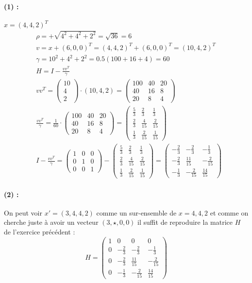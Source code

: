 \documentclass[11pt,a4paper]{report}
\newcommand{\matddd}[3]{\begin{pmatrix}#1\\#2\\#3\end{pmatrix}}
\begin{document}
\paragraph*{(1) : } $x=(4,4,2)^T$
\begin{align*}
& \rho = + \sqrt{4^2+4^2+2^2} = \sqrt{36} = 6 \\
& v = x + (6,0,0)^T = (4,4,2)^T+(6,0,0)^T = (10,4,2)^T \\
& \gamma = 10^2+4^2+2^2 = 0.5(100 + 16 + 4) = 60 \\
& H = I - \frac{vv^T}{\gamma} \\
& vv^T = \matddd{10}{4}{2} \cdot (10,4,2) = \begin{pmatrix}
100 & 40 & 20 \\
40  & 16 & 8  \\
20  & 8  & 4
\end{pmatrix}\\
&\frac{vv^T}{\gamma} = \frac{1}{60} \cdot \begin{pmatrix}
100 & 40 & 20 \\
40  & 16 & 8  \\
20  & 8  & 4
\end{pmatrix} = \begin{pmatrix}
\frac{5}{3} & \frac{2}{3} & \frac{1}{3} \\
\frac{2}{3} & \frac{4}{15} & \frac{2}{15}  \\
\frac{1}{3} & \frac{2}{15}  & \frac{1}{15}
\end{pmatrix}\\
& I - \frac{vv^T}{\gamma} = \begin{pmatrix}
1 & 0 & 0 \\
0 & 1 & 0 \\
0 & 0 & 1
\end{pmatrix} - \begin{pmatrix}
\frac{5}{3} & \frac{2}{3} & \frac{1}{3} \\
\frac{2}{3} & \frac{4}{15} & \frac{2}{15}  \\
\frac{1}{3} & \frac{2}{15}  & \frac{1}{15}
\end{pmatrix} =
\begin{pmatrix}
-\frac{2}{3} & -\frac{2}{3} & -\frac{1}{3} \\
-\frac{2}{3} & \frac{11}{15} & -\frac{2}{15} \\
-\frac{1}{3} & -\frac{2}{15} & \frac{14}{15} 
\end{pmatrix}
\end{align*}

\paragraph*{(2) : } On peut voir $x'=(3,4,4,2)$ comme un sur-ensemble de $x=4,4,2$ et comme on cherche juste à avoir un vecteur $(3,\star,0,0)$ il suffit de reproduire la matrice $H$ de l'exercice précédent :
$$
H = \begin{pmatrix}
1 & 0 & 0 & 0 \\
0 &-\frac{2}{3} & -\frac{2}{3} & -\frac{1}{3} \\
0 &-\frac{2}{3} & \frac{11}{15} & -\frac{2}{15} \\
0 &-\frac{1}{3} & -\frac{2}{15} & \frac{14}{15}
\end{pmatrix}
$$
\end{document}
